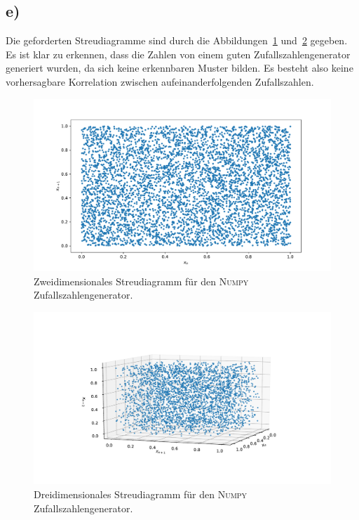 \documentclass[a4paper, 11pt]{article}
\begin{document}
\subsection*{e)}
Die geforderten Streudiagramme sind durch die Abbildungen~\ref{fig:a9e_2d} und~\ref{fig:a9e_3d} gegeben. Es ist klar zu erkennen, dass die Zahlen von einem guten Zufallszahlengenerator generiert wurden, da sich keine erkennbaren Muster bilden. Es besteht also keine vorhersagbare Korrelation zwischen aufeinanderfolgenden Zufallszahlen.
\begin{figure}
    \centering
    \includegraphics[width=\textwidth]{../A09/A9e_2D.pdf}
    \caption{Zweidimensionales Streudiagramm für den \textsc{Numpy} Zufallszahlengenerator.}
    \label{fig:a9e_2d}
\end{figure}
\begin{figure}
    \centering
    \includegraphics[width=\textwidth]{../A09/A9e_3D.pdf}
    \caption{Dreidimensionales Streudiagramm für den \textsc{Numpy} Zufallszahlengenerator.}
    \label{fig:a9e_3d}
\end{figure}
\FloatBarrier
\end{document}
